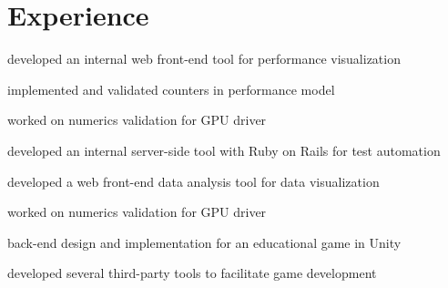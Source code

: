 \documentclass[]{deedy-resume-openfont}
\begin{document}
\hfill
\begin{minipage}[t]{0.66\textwidth} 


\section{Experience}

\vspace{\topsep} %
\begin{tightemize} 
\item developed an internal web front-end tool for performance visualization
\item implemented and validated counters in performance model
\item worked on numerics validation for GPU driver
\end{tightemize}
\sectionsep

\begin{tightemize} 
\item developed an internal server-side tool with Ruby on Rails for test automation
\item developed a web front-end data analysis tool for data visualization
\item worked on numerics validation for GPU driver
\end{tightemize}
\sectionsep

\begin{tightemize} 
\item back-end design and implementation for an educational game in Unity
\item developed several third-party tools to facilitate game development
\end{tightemize}
\sectionsep



\end{minipage}
\end{document}
